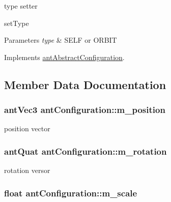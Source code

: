 type setter 

set\+Type 
\begin{DoxyParams}{Parameters}
{\em type} & S\+E\+L\+F or O\+R\+B\+I\+T \\
\hline
\end{DoxyParams}


Implements \hyperlink{classant_abstract_configuration}{ant\+Abstract\+Configuration}.



\subsection{Member Data Documentation}
\hypertarget{classant_configuration_ab9fd2e843700f3589988064a9a2b494d}{
\subsubsection[{m\+\_\+position}]{\setlength{\rightskip}{0pt plus 5cm}ant\+Vec3 ant\+Configuration\+::m\+\_\+position\hspace{0.3cm}{\ttfamily [private]}}}\label{classant_configuration_ab9fd2e843700f3589988064a9a2b494d}
position vector \hypertarget{classant_configuration_a2cd9ee51364f0481040a6c9c1faf42ac}{
\subsubsection[{m\+\_\+rotation}]{\setlength{\rightskip}{0pt plus 5cm}ant\+Quat ant\+Configuration\+::m\+\_\+rotation\hspace{0.3cm}{\ttfamily [private]}}}\label{classant_configuration_a2cd9ee51364f0481040a6c9c1faf42ac}
rotation versor \hypertarget{classant_configuration_ae1addd09ae683a014f37492aab019926}{
\subsubsection[{m\+\_\+scale}]{\setlength{\rightskip}{0pt plus 5cm}float ant\+Configuration\+::m\+\_\+scale\hspace{0.3cm}{\ttfamily [private]}}}\label{classant_configuration_ae1addd09ae683a014f37492aab019926}
